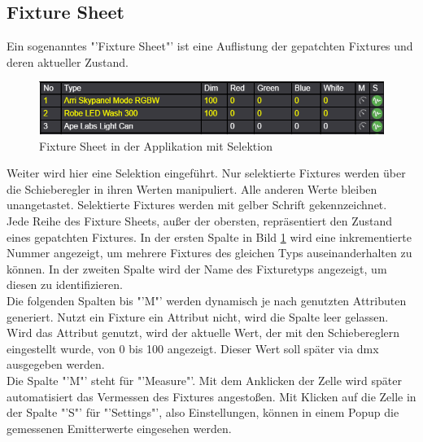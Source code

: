 \documentclass[11pt]{scrartcl}
\begin{document}
\subsection{Fixture Sheet}
Ein sogenanntes "'Fixture Sheet"' ist eine Auflistung der gepatchten Fixtures und deren aktueller Zustand.
\begin{figure}[H]
    \begin{center}
        \includegraphics[width=.9\textwidth]{images/app_fixture_sheet_dummy.png}
    \end{center}
    \vspace{-10pt}
    \caption{Fixture Sheet in der Applikation mit Selektion}\label{fig:fixtureSheet}
\end{figure}
\noindent
Weiter wird hier eine Selektion eingeführt. Nur selektierte Fixtures werden über die Schieberegler in ihren Werten manipuliert. Alle anderen Werte bleiben
unangetastet. Selektierte Fixtures werden mit gelber Schrift gekennzeichnet.\\
Jede Reihe des Fixture Sheets, außer der obersten, repräsentiert den Zustand eines gepatchten Fixtures. In der ersten Spalte in Bild \ref{fig:fixtureSheet}
wird eine inkrementierte Nummer angezeigt, um mehrere Fixtures des gleichen Typs auseinanderhalten zu können. In der zweiten Spalte wird der Name des
Fixturetyps angezeigt, um diesen zu identifizieren.\\
Die folgenden Spalten bis "'M"' werden dynamisch je nach genutzten Attributen generiert. Nutzt ein Fixture ein Attribut nicht, wird die Spalte leer gelassen.
Wird das Attribut genutzt, wird der aktuelle Wert, der mit den Schiebereglern eingestellt wurde, von 0 bis 100 angezeigt. Dieser Wert soll später via \ac{dmx}
ausgegeben werden.\\
Die Spalte "'M"' steht für "'Measure"'. Mit dem Anklicken der Zelle wird später automatisiert das Vermessen des Fixtures angestoßen. Mit Klicken auf die
Zelle in der Spalte "'S"' für "'Settings"', also Einstellungen, können in einem Popup die gemessenen Emitterwerte eingesehen werden.
\end{document}
